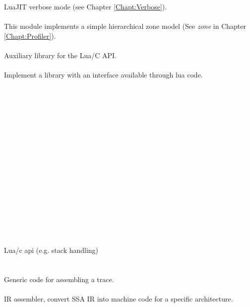 LuaJIT verbose mode (see Chapter \ref{Chapt:Verbose}).\\
\\
This module implements a simple hierarchical zone model
(See \emph{zone} in Chapter \ref{Chapt:Profiler}).\\
\\
Auxiliary library for the Lua/C API.\\
\\
Implement a library with an interface available through lua code.\\
\\
\\
\\
\\
\\
\\
\\
\\
\\
\\
\\
\\
\\
\\
\\
\\
\\
Lua/c api (e.g. stack handling)\\
\\
\\
Generic code for assembling a trace.\\
\\
IR assembler, convert SSA IR into machine code for a specific architecture.
\\
\\
\\
\\
\\
